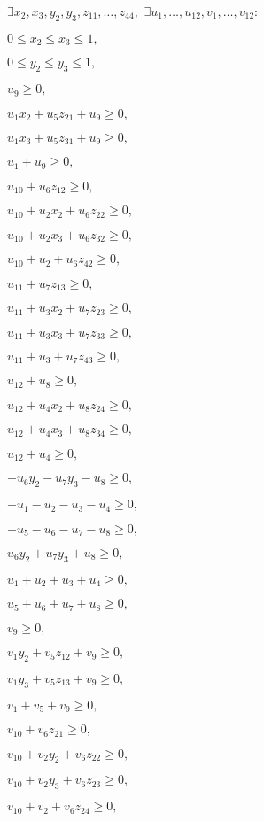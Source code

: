 \documentclass{article}
\begin{document}
$\exists x_2, x_3, y_2, y_3, z_{11},\dots,z_{44},$
$\exists u_1,\dots, u_{12}, v_1,\dots,v_{12}:$

$0 \leq x_2 \leq x_3 \leq 1,$

$0 \leq y_2 \leq y_3 \leq 1,$

$u_{9} \geq 0,$

$u_{1} x_{2} + u_{5} z_{21} + u_{9} \geq 0,$

$u_{1} x_{3} + u_{5} z_{31} + u_{9} \geq 0,$

$u_{1} + u_{9} \geq 0,$

$u_{10} + u_{6} z_{12} \geq 0,$

$u_{10} + u_{2} x_{2} + u_{6} z_{22} \geq 0,$

$u_{10} + u_{2} x_{3} + u_{6} z_{32} \geq 0,$

$u_{10} + u_{2} + u_{6} z_{42} \geq 0,$

$u_{11} + u_{7} z_{13} \geq 0,$

$u_{11} + u_{3} x_{2} + u_{7} z_{23} \geq 0,$

$u_{11} + u_{3} x_{3} + u_{7} z_{33} \geq 0,$

$u_{11} + u_{3} + u_{7} z_{43} \geq 0,$

$u_{12} + u_{8} \geq 0,$

$u_{12} + u_{4} x_{2} + u_{8} z_{24} \geq 0,$

$u_{12} + u_{4} x_{3} + u_{8} z_{34} \geq 0,$

$u_{12} + u_{4} \geq 0,$

$- u_{6} y_{2} - u_{7} y_{3} - u_{8} \geq 0,$

$- u_{1} - u_{2} - u_{3} - u_{4} \geq 0,$

$- u_{5} - u_{6} - u_{7} - u_{8} \geq 0,$

$u_{6} y_{2} + u_{7} y_{3} + u_{8} \geq 0,$

$u_{1} + u_{2} + u_{3} + u_{4} \geq 0,$

$u_{5} + u_{6} + u_{7} + u_{8} \geq 0,$

$v_{9} \geq 0,$

$v_{1} y_{2} + v_{5} z_{12} + v_{9} \geq 0,$

$v_{1} y_{3} + v_{5} z_{13} + v_{9} \geq 0,$

$v_{1} + v_{5} + v_{9} \geq 0,$

$v_{10} + v_{6} z_{21} \geq 0,$

$v_{10} + v_{2} y_{2} + v_{6} z_{22} \geq 0,$

$v_{10} + v_{2} y_{3} + v_{6} z_{23} \geq 0,$

$v_{10} + v_{2} + v_{6} z_{24} \geq 0,$
\end{document}

